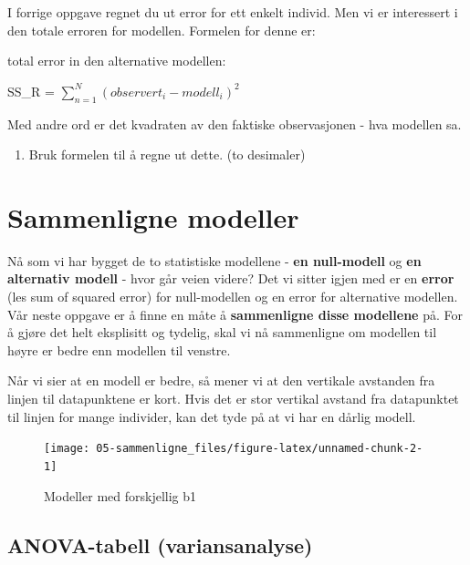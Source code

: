 \documentclass[
]{book}
\providecommand{\tightlist}{%
  \setlength{\itemsep}{0pt}\setlength{\parskip}{0pt}}
\begin{document}
I forrige oppgave regnet du ut error for ett enkelt individ. Men vi er interessert i den totale erroren for modellen. Formelen for denne er:

total error in den alternative modellen:

SS\_R = \(\sum_{n=1}^N (observert_i - modell_i)^2\)

Med andre ord er det kvadraten av den faktiske observasjonen - hva modellen sa.

\begin{enumerate}
\def\labelenumi{\alph{enumi}.}
\setcounter{enumi}{14}
\tightlist
\item
  Bruk formelen til å regne ut dette. (to desimaler)
\end{enumerate}

\hypertarget{sammenligne-modeller}{%
\chapter{Sammenligne modeller}\label{sammenligne-modeller}}

Nå som vi har bygget de to statistiske modellene - \textbf{en null-modell} og \textbf{en alternativ modell} - hvor går veien videre? Det vi sitter igjen med er en \textbf{error} (les sum of squared error) for null-modellen og en error for alternative modellen. Vår neste oppgave er å finne en måte å \textbf{sammenligne disse modellene} på. For å gjøre det helt eksplisitt og tydelig, skal vi nå sammenligne om modellen til høyre er bedre enn modellen til venstre.

Når vi sier at en modell er bedre, så mener vi at den vertikale avstanden fra linjen til datapunktene er kort. Hvis det er stor vertikal avstand fra datapunktet til linjen for mange individer, kan det tyde på at vi har en dårlig modell.

\begin{figure}

{\centering \texttt{[image: 05-sammenligne\_files/figure-latex/unnamed-chunk-2-1]} 

}

\caption{Modeller med forskjellig b1}\label{fig:unnamed-chunk-2}
\end{figure}

\hypertarget{anova-tabell-variansanalyse}{%
\section{ANOVA-tabell (variansanalyse)}\label{anova-tabell-variansanalyse}}
\end{document}

